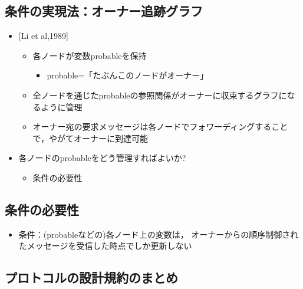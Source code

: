 \documentclass[25pt,landscape,papersize]{jsarticle}
\begin{document}

\subsection{条件\I の実現法：オーナー追跡グラフ}

\begin{itemize}
\item {}[Li et al,1989]
  \begin{itemize}
  \item 各ノードが変数probableを保持
    \begin{itemize}
    \item probable=「たぶんこのノードがオーナー」
    \end{itemize}
  \item 全ノードを通じたprobableの参照関係がオーナーに収束するグラフになるように管理
  \item オーナー宛の要求メッセージは各ノードでフォワーディングすることで，やがてオーナーに到達可能
  \end{itemize}
\item 各ノードのprobableをどう管理すればよいか?
  \begin{itemize}
  \item 条件\III の必要性
  \end{itemize}
\end{itemize}

\subsection{条件\III の必要性}

\begin{itemize}
\item 条件\III ：(probableなどの)各ノード上の変数は，
  オーナーからの順序制御されたメッセージを受信した時点でしか更新しない
\end{itemize}



\subsection{プロトコルの設計規約のまとめ}
\end{document}
